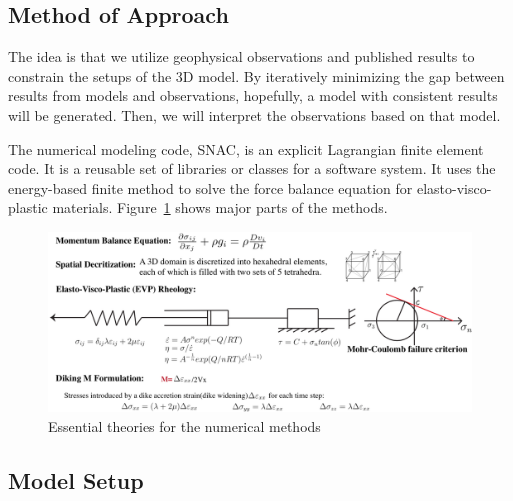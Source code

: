 \documentclass[12pt]{article}
\begin{document}

\break
\subsection{Method of Approach}
\label{ch:method}

The idea is that we utilize geophysical observations and published results to constrain the setups of the 3D model. By iteratively minimizing the gap between results from models and observations, hopefully, a model with consistent results will be generated. Then, we will interpret the observations based on that model.

The numerical modeling code, SNAC, is an explicit Lagrangian finite element code. It is a reusable set of libraries or classes for a software system. It uses the energy-based finite  method to solve the force balance equation for elasto-visco-plastic materials. Figure~\ref{fig7_1} shows major parts of the methods.

\begin{figure}[H]
 \centering
  \includegraphics[scale=0.46]{fig7_1.png}
 \caption{\small{Essential theories for the numerical methods}}
 \label{fig7_1}
\end{figure}

\subsection{Model Setup}
\end{document}
